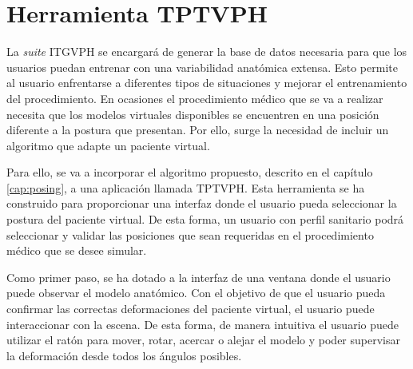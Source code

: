 \section{Herramienta \ac{TPTVPH}}
\label{rasim:posing}

La \emph{suite} \ac{ITGVPH} se encargará de generar la base de datos necesaria para que los usuarios puedan entrenar con una variabilidad anatómica extensa. Esto permite al usuario enfrentarse a diferentes tipos de situaciones y mejorar el entrenamiento del procedimiento. En ocasiones el procedimiento médico que se va a realizar necesita que los modelos virtuales disponibles se encuentren en una posición diferente a la postura que presentan. Por ello, surge la necesidad de incluir un algoritmo que adapte un paciente virtual.

%


Para ello,  se va a incorporar el algoritmo propuesto, descrito en el capítulo \ref{cap:posing}, a una aplicación llamada \ac{TPTVPH}. Esta herramienta se ha construido para proporcionar una interfaz donde el usuario pueda seleccionar la postura del paciente virtual. De esta forma, un usuario con perfil sanitario podrá seleccionar y validar las posiciones que sean requeridas en el procedimiento médico que se desee simular.



Como primer paso, se ha dotado a la interfaz de una ventana donde el usuario puede observar el modelo anatómico. Con el objetivo de que el usuario pueda confirmar las correctas deformaciones del paciente virtual, el usuario puede interaccionar con la escena. De esta forma, de manera intuitiva el usuario puede utilizar el ratón para mover, rotar, acercar o alejar el modelo y poder supervisar la deformación desde todos los ángulos posibles.

